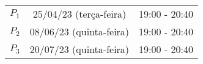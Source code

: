 \documentclass{beamer}
\begin{document}
    \begin{frame}
        \begin{center}
            \begin{tabular}{c|c|c}
                \hline\hline
                \hspace{1cm}{\bf Prova}\hspace{1cm} & \hspace{3cm}{\bf Data}\hspace{3cm} & \hspace{1.7cm}{\bf Hor\'{a}rio}\hspace{1.7cm} \\
                \hline\hline
                $P_1$ & 25/04/23 (terça-feira) \phantom{x} & 19:00 - 20:40 \\
                \hline
                $P_2$ & 08/06/23 (quinta-feira) \phantom{x} & 19:00 - 20:40 \\
                \hline
                $P_3$ & 20/07/23 (quinta-feira) \phantom{x} & 19:00 - 20:40 \\
                \hline\hline
            \end{tabular}
        \end{center}
    \end{frame}
\end{document}

